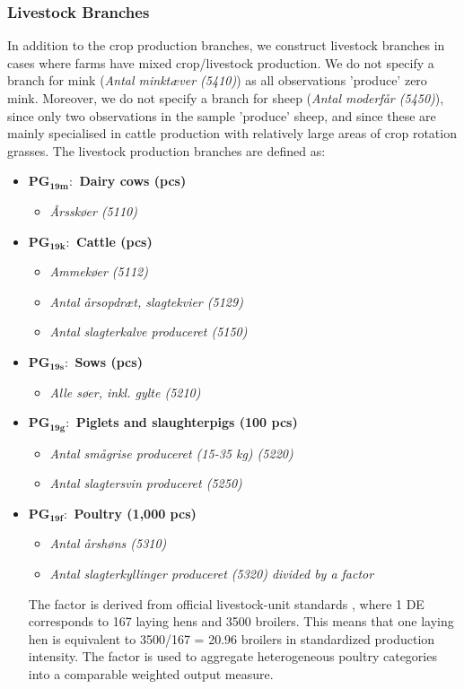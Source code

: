 \documentclass[12pt]{article}
\begin{document}
\subsubsection{Livestock Branches}
In addition to the crop production branches, we construct livestock branches in cases where farms have mixed crop/livestock production. 
We do not specify a branch for mink (\textit{Antal minktæver (5410)}) as all observations 'produce' zero mink. 
Moreover, we do not specify a branch for sheep (\textit{Antal moderfår (5450)}), since only two observations in the sample 'produce' sheep, and since these are mainly specialised in cattle production with relatively large areas of crop rotation grasses.
The livestock production branches are defined as:
\begin{itemize}
   \item[] \textbf{PG$_{\textbf{19m}}:$ Dairy cows (pcs)}
   \begin{itemize}
       \item[$+$] \textit{Årsskøer (5110)}
   \end{itemize}
   \item[] \textbf{PG$_{\textbf{19k}}:$ Cattle (pcs)}
    \begin{itemize}
        \item[$+$] \textit{Ammekøer (5112)}
        \item[$+$] \textit{Antal årsopdræt, slagtekvier (5129)}
        \item[$+$] \textit{Antal slagterkalve produceret (5150)}
    \end{itemize}
    \item[] \textbf{PG$_{\textbf{19s}}:$ Sows (pcs)}
    \begin{itemize}
        \item[$+$] \textit{Alle søer, inkl. gylte (5210)}
    \end{itemize}
    \item[] \textbf{PG$_{\textbf{19g}}:$ Piglets and slaughterpigs (100 pcs)}
    \begin{itemize}
        \item[$+$] \textit{Antal smågrise produceret (15-35 kg) (5220)}
        \item[$+$] \textit{Antal slagtersvin produceret (5250)}
    \end{itemize}
    \item[] \textbf{PG$_{\textbf{19f}}:$ Poultry (1,000 pcs)}
     \begin{itemize}
        \item[$+$] \textit{Antal årshøns (5310)}
        \item[$+$] \textit{Antal slagterkyllinger produceret (5320) divided by a factor}
    \end{itemize}
    The factor is derived from official livestock-unit standards \citep{husdyrgoedning-bilag12017}, where 1 DE corresponds to 167 laying hens and 3500 broilers. 
    This means that one laying hen is equivalent to 3500/167 = 20.96 broilers in standardized production intensity. 
    The factor is used to aggregate heterogeneous poultry categories into a comparable weighted output measure.
\end{itemize}
\end{document}
